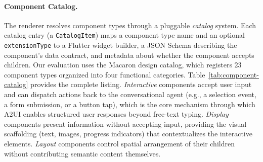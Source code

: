 \documentclass{llmxive}
\begin{document}
\paragraph{Component Catalog.}
The renderer resolves component types through a pluggable \emph{catalog} system. Each catalog entry (a \texttt{CatalogItem}) maps a component type name and an optional \texttt{extensionType} to a Flutter widget builder, a JSON Schema describing the component's data contract, and metadata about whether the component accepts children. Our evaluation uses the Macaron design catalog, which registers 23 component types organized into four functional categories. Table~\ref{tab:component-catalog} provides the complete listing. \emph{Interactive} components accept user input and can dispatch actions back to the conversational agent (e.g., a selection event, a form submission, or a button tap), which is the core mechanism through which A2UI enables structured user responses beyond free-text typing. \emph{Display} components present information without accepting input, providing the visual scaffolding (text, images, progress indicators) that contextualizes the interactive elements. \emph{Layout} components control spatial arrangement of their children without contributing semantic content themselves.
\end{document}
